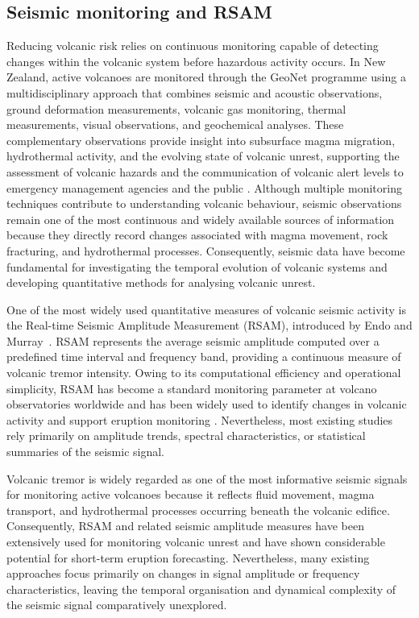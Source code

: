 \documentclass[12pt,a4paper]{article}
\begin{document}
\subsection{Seismic monitoring and RSAM}

Reducing volcanic risk relies on continuous monitoring capable of detecting changes within the volcanic system before hazardous activity occurs. In New Zealand, active volcanoes are monitored through the GeoNet programme using a multidisciplinary approach that combines seismic and acoustic observations, ground deformation measurements, volcanic gas monitoring, thermal measurements, visual observations, and geochemical analyses. These complementary observations provide insight into subsurface magma migration, hydrothermal activity, and the evolving state of volcanic unrest, supporting the assessment of volcanic hazards and the communication of volcanic alert levels to emergency management agencies and the public \cite{GNSVolcanoMonitoring}. Although multiple monitoring techniques contribute to understanding volcanic behaviour, seismic observations remain one of the most continuous and widely available sources of information because they directly record changes associated with magma movement, rock fracturing, and hydrothermal processes. Consequently, seismic data have become fundamental for investigating the temporal evolution of volcanic systems and developing quantitative methods for analysing volcanic unrest.

One of the most widely used quantitative measures of volcanic seismic activity is the Real-time Seismic Amplitude Measurement (RSAM), introduced by Endo and Murray~\cite{Endo1991}. RSAM represents the average seismic amplitude computed over a predefined time interval and frequency band, providing a continuous measure of volcanic tremor intensity. Owing to its computational efficiency and operational simplicity, RSAM has become a standard monitoring parameter at volcano observatories worldwide and has been widely used to identify changes in volcanic activity and support eruption monitoring \cite{Endo1991}. Nevertheless, most existing studies rely primarily on amplitude trends, spectral characteristics, or statistical summaries of the seismic signal.

Volcanic tremor is widely regarded as one of the most informative seismic signals for monitoring active volcanoes because it reflects fluid movement, magma transport, and hydrothermal processes occurring beneath the volcanic edifice. Consequently, RSAM and related seismic amplitude measures have been extensively used for monitoring volcanic unrest and have shown considerable potential for short-term eruption forecasting. Nevertheless, many existing approaches focus primarily on changes in signal amplitude or frequency characteristics, leaving the temporal organisation and dynamical complexity of the seismic signal comparatively unexplored.
\end{document}
